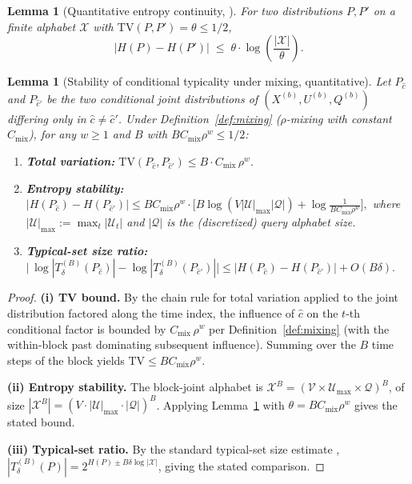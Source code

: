 \documentclass[11pt]{article}
\newcommand{\V}{\mathcal{V}}
\newcommand{\TV}{\mathrm{TV}}
\theoremstyle{plain}
\newtheorem{lemma}[theorem]{Lemma}
\theoremstyle{definition}
\theoremstyle{remark}
\begin{document}
\begin{lemma}[Quantitative entropy continuity, ]
\label{lem:csiszar-korner}
For two distributions $P, P'$ on a finite alphabet $\mathcal{X}$ with
$\TV(P, P') = \theta \leq 1/2$,
\[
|H(P) - H(P')| \;\leq\; \theta \cdot \log\!\left( \frac{|\mathcal{X}|}{\theta} \right).
\]
\end{lemma}

\begin{lemma}[Stability of conditional typicality under mixing, quantitative]
\label{lem:cond-typ-mix}
Let $P_{\hat c}$ and $P_{\hat c'}$ be the two conditional joint
distributions of $(X^{(b)}, U^{(b)}, Q^{(b)})$ differing only in
$\hat c \neq \hat c'$. Under Definition~\ref{def:mixing}
($\rho$-mixing with constant $C_{\mathrm{mix}}$), for any $w \geq 1$
and $B$ with $B C_{\mathrm{mix}} \rho^w \leq 1/2$:
\begin{enumerate}[label=\textup{(\roman*)}, leftmargin=*]
\item \textbf{Total variation:}
\(
\TV(P_{\hat c}, P_{\hat c'}) \leq B \cdot C_{\mathrm{mix}}\, \rho^w.
\)

\item \textbf{Entropy stability:}
\(
|H(P_{\hat c}) - H(P_{\hat c'})|
\leq B C_{\mathrm{mix}}\rho^w \cdot \bigl[B \log(V|\mathcal{U}|_{\max}|\mathcal{Q}|) + \log\!\tfrac{1}{B C_{\mathrm{mix}}\rho^w}\bigr],
\)
where $|\mathcal{U}|_{\max} := \max_t |\mathcal{U}_t|$ and $|\mathcal{Q}|$
is the (discretized) query alphabet size.

\item \textbf{Typical-set size ratio:}
\(
\bigl|\,\log|T_\delta^{(B)}(P_{\hat c})| - \log|T_\delta^{(B)}(P_{\hat c'})|\bigr|
\leq |H(P_{\hat c}) - H(P_{\hat c'})| + O(B\delta).
\)
\end{enumerate}
\end{lemma}

\begin{proof}
\textbf{(i) TV bound.}
By the chain rule for total variation
\citep[Lemma 3.3.7]{boucheron2013concentration} applied to the joint
distribution factored along the time index, the influence of
$\hat c$ on the $t$-th conditional factor is bounded by
$C_{\mathrm{mix}}\, \rho^w$ per Definition~\ref{def:mixing} (with the
within-block past dominating subsequent influence). Summing over the
$B$ time steps of the block yields $\TV \leq B C_{\mathrm{mix}}\rho^w$.

\textbf{(ii) Entropy stability.}
The block-joint alphabet is $\mathcal{X}^B = (\V \times \mathcal{U}_{\max} \times \mathcal{Q})^B$,
of size $|\mathcal{X}^B| = (V \cdot |\mathcal{U}|_{\max} \cdot |\mathcal{Q}|)^B$.
Applying Lemma~\ref{lem:csiszar-korner} with $\theta = BC_{\mathrm{mix}}\rho^w$
gives the stated bound.

\textbf{(iii) Typical-set ratio.}
By the standard typical-set size estimate
\citep[Theorem 2.3]{elgamal2011network},
$|T_\delta^{(B)}(P)| = 2^{H(P) \pm B\delta\log|\mathcal{X}|}$, giving
the stated comparison.
\end{proof}
\end{document}
